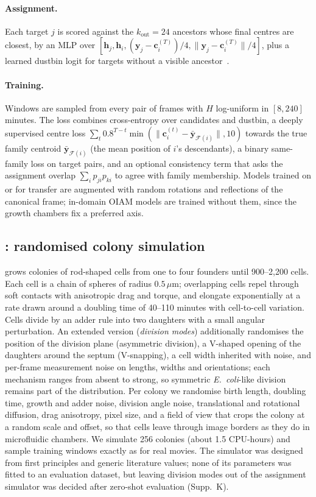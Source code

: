 \paragraph{Assignment.}
Each target $j$ is scored against the $k_{\text{out}}{=}24$ ancestors whose final centres are closest, by an MLP over $[\mathbf{h}_j,\mathbf{h}_i,(\mathbf{y}_j-\mathbf{c}_i^{(T)})/4,\|\mathbf{y}_j-\mathbf{c}_i^{(T)}\|/4]$, plus a learned dustbin logit for targets without a visible ancestor~\cite{sarlin2020superglue}.

\paragraph{Training.}
Windows are sampled from every pair of frames with $H$ log-uniform in $[8,240]$ minutes.
The loss combines cross-entropy over candidates and dustbin, a deeply supervised centre loss $\sum_t 0.8^{T-t}\min(\|\mathbf{c}_i^{(t)}-\bar{\mathbf{y}}_{\mathcal{F}(i)}\|,10)$ towards the true family centroid $\bar{\mathbf{y}}_{\mathcal{F}(i)}$ (the mean position of $i$'s descendants), a binary same-family loss on target pairs, and an optional consistency term that asks the assignment overlap $\sum_i p_{ji}p_{ki}$ to agree with family membership.
Models trained on \rodsim or for transfer are augmented with random rotations and reflections of the canonical frame; in-domain OIAM models are trained without them, since the growth chambers fix a preferred axis.

\subsection{\rodsim: randomised colony simulation}
\label{sec:sim}

\rodsim grows colonies of rod-shaped cells from one to four founders until 900--2{,}200 cells.
Each cell is a chain of spheres of radius $0.5\,\mu$m; overlapping cells repel through soft contacts with anisotropic drag and torque, and elongate exponentially at a rate drawn around a doubling time of 40--110 minutes with cell-to-cell variation.
Cells divide by an adder rule into two daughters with a small angular perturbation.
An extended version (\emph{division modes}) additionally randomises the position of the division plane (asymmetric division), a V-shaped opening of the daughters around the septum (V-snapping), a cell width inherited with noise, and per-frame measurement noise on lengths, widths and orientations; each mechanism ranges from absent to strong, so symmetric \emph{E.~coli}-like division remains part of the distribution.
Per colony we randomise birth length, doubling time, growth and adder noise, division angle noise, translational and rotational diffusion, drag anisotropy, pixel size, and a field of view that crops the colony at a random scale and offset, so that cells leave through image borders as they do in microfluidic chambers.
We simulate 256 colonies (about 1.5 CPU-hours) and sample training windows exactly as for real movies.
The simulator was designed from first principles and generic literature values; none of its parameters was fitted to an evaluation dataset, but leaving division modes out of the assignment simulator was decided after zero-shot evaluation (Supp.~K).


